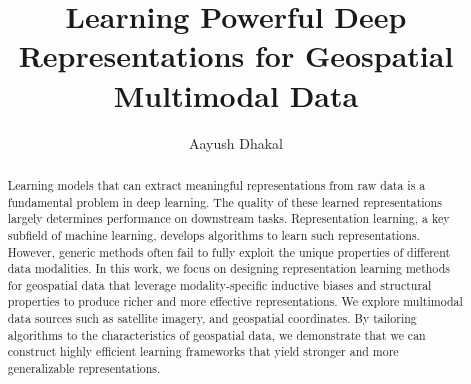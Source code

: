 \documentclass[11pt]{article}
\author{Aayush Dhakal}
\title{Learning Powerful Deep Representations for Geospatial Multimodal Data}
\begin{document}
\maketitle

\begin{abstract}
Learning models that can extract meaningful representations from raw data is a fundamental problem in deep learning. The quality of these learned representations largely determines performance on downstream tasks. Representation learning, a key subfield of machine learning, develops algorithms to learn such representations. However, generic methods often fail to fully exploit the unique properties of different data modalities. In this work, we focus on designing representation learning methods for geospatial data that leverage modality-specific inductive biases and structural properties to produce richer and more effective representations. We explore multimodal data sources such as satellite imagery, and geospatial coordinates. By tailoring algorithms to the characteristics of geospatial data, we demonstrate that we can construct highly efficient learning frameworks that yield stronger and more generalizable representations. 

\end{abstract}

\newpage

{\tableofcontents }






% 




\end{document}
